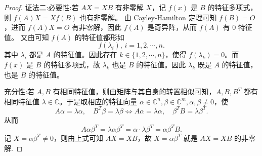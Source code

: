 \documentclass[../../main.tex]{subfiles}%
\begin{document}
\begin{proof}
{\color{blue} 证法二:}{\heiti 必要性:}若 \( AX = XB \) 有非零解 \( X \)，记 \( f(x) \) 是 \( B \) 的特征多项式，则 \( f(A)X = Xf(B) \) 也有非零解。  
由 Cayley-Hamilton 定理可知 \( f(B) = O \)，进而 \( f(A)X = O \) 有非零解，因此 \( f(A) \) 是奇异阵，从而 \( f(A) \) 有 \( 0 \) 特征值。  
又由可知 \( f(A) \) 的特征值都形如  
\[ f(\lambda_i), \, i = 1,2,\cdots,n. \]  
其中 \( \lambda_i \) 都是 \( A \) 的特征值。因此存在 \( k \in \{1,2,\cdots,n\} \)，使得 \( f(\lambda_k) = 0 \)。而 \( f(x) \) 是 \( B \) 的特征多项式，故 \( \lambda_k \) 也是 \( B \) 的特征值。因此 \( \lambda_k \) 既是 \( A \) 的特征值，也是 \( B \) 的特征值。  

{\heiti 充分性:}若 \( A,B \) 有相同特征值，则由\hyperref[proposition:lambda-矩阵一定与其转置相似]{矩阵与其自身的转置相似}可知，\( A,B,B^T \) 都有相同特征值 \( \lambda \in \mathbb{C} \)。于是取相应的特征向量 \( \alpha \in \mathbb{C}^n, \beta \in \mathbb{C}^m, \alpha,\beta \ne 0 \)，使  
\[ A\alpha = \lambda \alpha, \quad B^T\beta = \lambda \beta \Longleftrightarrow A\alpha = \lambda \alpha, \quad \beta^TB = \lambda \beta^T. \]  
从而  
\[ A\alpha\beta^T = \lambda \alpha\beta^T = \alpha \cdot \lambda \beta^T = \alpha\beta^TB. \]  
记 \( X = \alpha\beta^T \ne 0 \)，则由上式可知 \( AX = XB \)，故 \( X = \alpha\beta^T \) 就是 \( AX = XB \) 的非零解. 
\end{proof}
\end{document}
